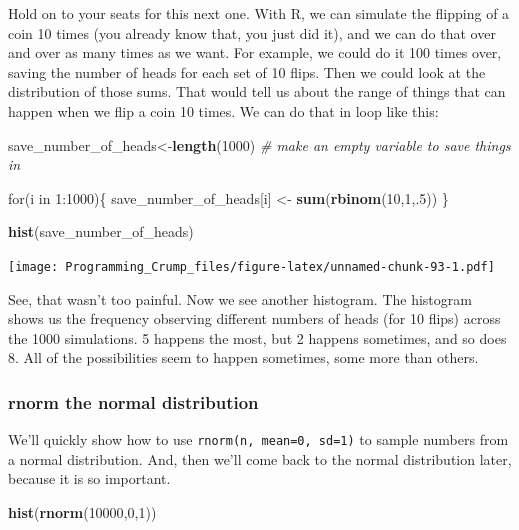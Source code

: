 \documentclass[]{book}
\newenvironment{Shaded}{\begin{snugshade}}{\end{snugshade}}
\newcommand{\KeywordTok}[1]{\textcolor[rgb]{0.13,0.29,0.53}{\textbf{{#1}}}}
\newcommand{\DecValTok}[1]{\textcolor[rgb]{0.00,0.00,0.81}{{#1}}}
\newcommand{\StringTok}[1]{\textcolor[rgb]{0.31,0.60,0.02}{{#1}}}
\newcommand{\CommentTok}[1]{\textcolor[rgb]{0.56,0.35,0.01}{\textit{{#1}}}}
\newcommand{\NormalTok}[1]{{#1}}
\theoremstyle{definition}
\theoremstyle{definition}
\theoremstyle{definition}
\theoremstyle{remark}
\begin{document}
Hold on to your seats for this next one. With R, we can simulate the
flipping of a coin 10 times (you already know that, you just did it),
and we can do that over and over as many times as we want. For example,
we could do it 100 times over, saving the number of heads for each set
of 10 flips. Then we could look at the distribution of those sums. That
would tell us about the range of things that can happen when we flip a
coin 10 times. We can do that in loop like this:

\begin{Shaded}
\begin{Highlighting}[]
\NormalTok{save_number_of_heads<-}\KeywordTok{length}\NormalTok{(}\DecValTok{1000}\NormalTok{) }\CommentTok{# make an empty variable to save things in}

\NormalTok{for(i in }\DecValTok{1}\NormalTok{:}\DecValTok{1000}\NormalTok{)\{}
  \NormalTok{save_number_of_heads[i] <-}\StringTok{ }\KeywordTok{sum}\NormalTok{(}\KeywordTok{rbinom}\NormalTok{(}\DecValTok{10}\NormalTok{,}\DecValTok{1}\NormalTok{,.}\DecValTok{5}\NormalTok{))}
\NormalTok{\}}

\KeywordTok{hist}\NormalTok{(save_number_of_heads)}
\end{Highlighting}
\end{Shaded}

\texttt{[image: Programming\_Crump\_files/figure-latex/unnamed-chunk-93-1.pdf]}

See, that wasn't too painful. Now we see another histogram. The
histogram shows us the frequency observing different numbers of heads
(for 10 flips) across the 1000 simulations. 5 happens the most, but 2
happens sometimes, and so does 8. All of the possibilities seem to
happen sometimes, some more than others.

\subsubsection{rnorm the normal
distribution}\label{rnorm-the-normal-distribution}

We'll quickly show how to use \texttt{rnorm(n,\ mean=0,\ sd=1)} to
sample numbers from a normal distribution. And, then we'll come back to
the normal distribution later, because it is so important.

\begin{Shaded}
\begin{Highlighting}[]
\KeywordTok{hist}\NormalTok{(}\KeywordTok{rnorm}\NormalTok{(}\DecValTok{10000}\NormalTok{,}\DecValTok{0}\NormalTok{,}\DecValTok{1}\NormalTok{))}
\end{Highlighting}
\end{Shaded}
\end{document}
